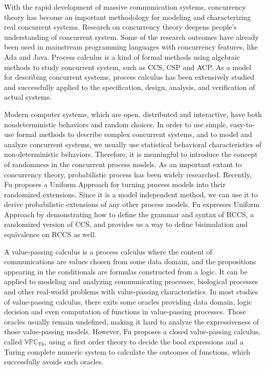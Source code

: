 
\begin{digest}
  With the rapid development of massive communication systems, concurrency theory has become an important methodology for modeling and characterizing real concurrent systems. Research on concurrency theory deepens people’s understanding of concurrent system. Some of the research outcomes have already been used in mainstream programming languages with concurrency features, like Ada and Java. Process calculus is a kind of formal methods using algebraic methods to study concurrent system, such as CCS, CSP and ACP. As a model for describing concurrent systems, process calculus has been extensively studied and successfully applied to the specification, design, analysis, and verification of actual systems.

  Modern computer systems, which are open, distributed and interactive, have both nondeterministic behaviors and random choices. In order to use simple, easy-to-use formal methods to describe complex concurrent systems, and to model and analyze concurrent systems, we usually use statistical behavioral characteristics of non-deterministic behaviors. Therefore, it is meaningful to introduce the concept of randomness in the concurrent process models. As an important extant to concurrency theory, probabilistic process has been widely researched. Recently, Fu proposes a Uniform Approach for turning process models into their randomized extensions. Since it is a model independent method, we can use it to derive probabilistic extensions of any other process models. Fu expresses Uniform Approach by demonstrating how to define the grammar and syntax of RCCS, a randomized version of CCS, and provides us a way to define bisimulation and equivalence on RCCS as well.

  A value-passing calculus is a process calculus where the content of communications are values chosen from some data domain, and the propositions appearing in the conditionals are formulas constructed from a logic. It can be applied to modeling and analyzing communicating processes, biological processes and other real-world problems with value-passing characteristics. In most studies of value-passing calculus, there exits some oracles providing data domain, logic decision and even computation of functions in value-passing processes. Those oracles usually remain undefined, making it hard to analyze the expressiveness of those value-passing models. However, Fu proposes a closed value-passing calculus, called $\mathbb{VPC}_{\mathsf{Th}}$, using a first order theory to decide the bool expressions and a Turing complete numeric system to calculate the outcomes of functions, which successfully avoids such oracles. 
  

\end{digest}
